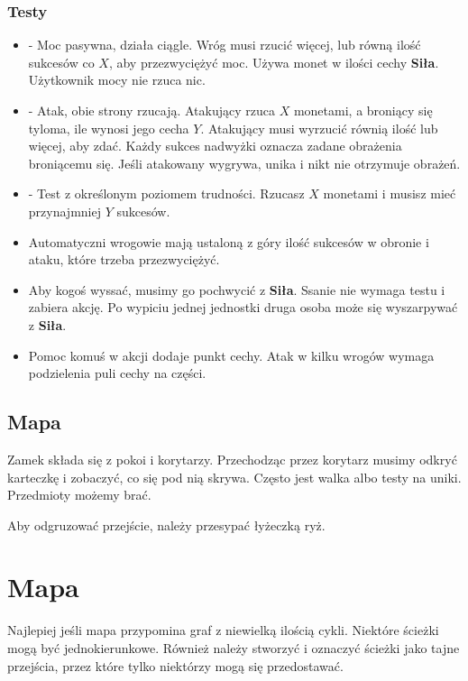 		\subsubsection{Testy}
			\begin{itemize}[noitemsep]
				\item {} - Moc pasywna, działa ciągle. Wróg musi rzucić więcej, lub równą ilość sukcesów co $X$, aby przezwyciężyć moc. Używa monet w ilości cechy \textbf{Siła}. Użytkownik mocy nie rzuca nic.
				\item {} - Atak, obie strony rzucają. Atakujący rzuca $X$ monetami, a broniący się tyloma, ile wynosi jego cecha $Y$. Atakujący musi wyrzucić równią ilość lub więcej, aby zdać. Każdy sukces nadwyżki oznacza zadane obrażenia broniącemu się. Jeśli atakowany wygrywa, unika i nikt nie otrzymuje obrażeń.
				\item {} - Test z określonym poziomem trudności. Rzucasz $X$ monetami i musisz mieć przynajmniej $Y$ sukcesów.
				\item Automatyczni wrogowie mają ustaloną z góry ilość sukcesów w obronie i ataku, które trzeba przezwyciężyć.
				\item Aby kogoś wyssać, musimy go pochwycić z \textbf{Siła}. Ssanie nie wymaga testu i zabiera akcję. Po wypiciu jednej jednostki druga osoba może się wyszarpywać z \textbf{Siła}.
				\item Pomoc komuś w akcji dodaje punkt cechy. Atak w kilku wrogów wymaga podzielenia puli cechy na części.
			\end{itemize}
			
		\subsection{Mapa}
			Zamek składa się z pokoi i korytarzy.
			Przechodząc przez korytarz musimy odkryć karteczkę i zobaczyć, co się pod nią skrywa.
			Często jest walka albo testy na uniki.
			Przedmioty możemy brać.
			
			Aby odgruzować przejście, należy przesypać łyżeczką ryż.
	
\section{Mapa}
	Najlepiej jeśli mapa przypomina graf z niewielką ilością cykli.
	Niektóre ścieżki mogą być jednokierunkowe.
	Również należy stworzyć i oznaczyć ścieżki jako tajne przejścia, przez które tylko niektórzy mogą się przedostawać.
	
